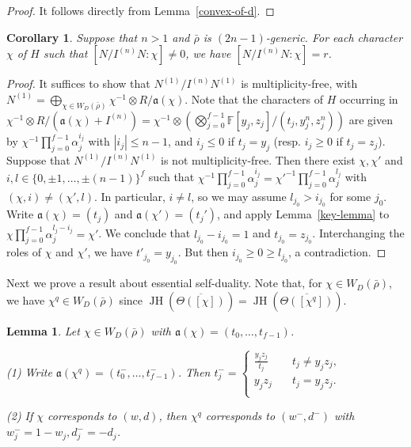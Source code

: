 \documentclass{article}
\newtheorem{corollary}[definition]{Corollary}
\newtheorem{lemma}[definition]{Lemma}
\numberwithin{equation}{section}
\DeclareMathOperator{\JH}{JH}
\newcommand{\fa}{\mathfrak{a}}
\newcommand{\bF}{\mathbb{F}}
\begin{document}
\begin{proof}
   It follows directly from Lemma~\ref{convex-of-d}. 
\end{proof}

\begin{corollary}\label{N-multi-free}
    Suppose that $n>1$ and $\bar{\rho}$ is $(2n-1)$-generic. For each character $\chi$ of $H$ such that $[N/I^{(n)}N:\chi]\ne 0$, we have $[N/I^{(n)}N:\chi]=r$. 
\end{corollary}

\begin{proof}
    It suffices to show that $N^{(1)}/I^{(n)}N^{(1)}$ is multiplicity-free, with $N^{(1)}=\bigoplus_{\chi\in W_{D}(\bar{\rho})}\chi^{-1}\otimes R/\fa(\chi)$. 
    Note that the characters of $H$ occurring in $\chi^{-1}\otimes R/(\fa(\chi)+I^{(n)})=\chi^{-1}\otimes (\bigotimes_{j=0}^{f-1}\bF[y_j,z_j]/(t_j,y_j^n,z_j^n)) $ are given by $\chi^{-1}\prod_{j=0}^{f-1}\alpha_j^{i_j}$ with $|i_j|\leq n-1$, and $i_j\leq 0$ if $t_j=y_j$ (resp. $i_j\geq 0$ if $t_j=z_j$). 
    Suppose that $N^{(1)}/I^{(n)}N^{(1)}$ is not multiplicity-free. Then there exist $\chi,\chi'$ and $i,l\in \{0,\pm1,\ldots,\pm(n-1)\}^f$ such that $\chi^{-1}\prod_{j=0}^{f-1}\alpha_j^{i_j}=\chi'^{-1}\prod_{j=0}^{f-1}\alpha_j^{l_j}$ with $(\chi,i)\ne(\chi',l)$. 
    In particular, $i\ne l$, so we may assume $l_{j_0}>i_{j_0}$ for some $j_0$. 
    Write $\fa(\chi)=(t_j)$ and $\fa(\chi')=(t_j')$, 
    and apply Lemma~\ref{key-lemma} to $\chi\prod_{j=0}^{f-1}\alpha_j^{l_j-i_j}=\chi'$. 
    We conclude that $l_{j_0}-i_{j_0}=1$ and $t_{j_0}=z_{j_0}$. 
    Interchanging the roles of $\chi$ and $\chi'$, we have $t'_{j_0}=y_{j_0}$. 
    But then $i_{j_0}\geq 0\geq l_{j_0}$, a contradiction. 
\end{proof}

Next we prove a result about essential self-duality. 
Note that, for $\chi\in W_D(\bar{\rho})$, we have $\chi^{q}\in W_D(\bar{\rho})$ since $\JH(\overline{\Theta([\chi])})=\JH(\overline{\Theta([\chi^q])})$. 


\begin{lemma}\label{chi^q}
    Let $\chi\in W_D(\bar{\rho})$ with $\fa(\chi)=(t_0,\ldots,t_{f-1})$. 

    (1) Write $\fa(\chi^q)=(t_0^-,\ldots,t_{f-1}^-)$. 
    Then $t_j^-=\begin{cases}
        \frac{y_jz_j}{t_j}\quad & t_j\ne y_jz_j,\\
        y_jz_j\quad & t_j=y_jz_j.\\
    \end{cases}$
    
    (2) If $\chi$ corresponds to $(w,d)$, then
    $\chi^{q}$ corresponds to $(w^-, d^-)$ with $w^-_j=1-w_j, d^-_j=-d_j$. 
\end{lemma}
\end{document}

